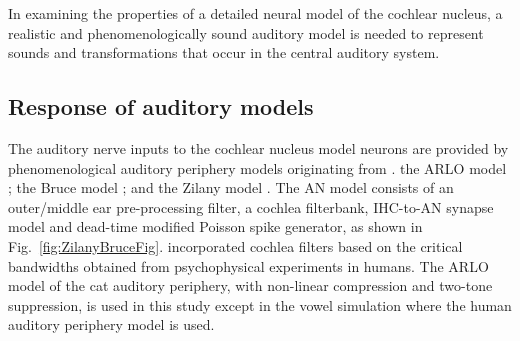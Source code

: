 \smallskip{}


\smallskip{}


%
\smallskip{}

In examining the properties of a detailed neural model of the cochlear nucleus,
a realistic and phenomenologically sound auditory model is needed to represent
sounds and transformations that occur in the central auditory system.

%
\smallskip{}
\subsection{Response of auditory models}\label{sec:CN:resp-audit-models}

The auditory nerve inputs to the cochlear nucleus model neurons are provided by
phenomenological auditory periphery models originating from
\citet{Carney:1993}. the ARLO model \citep{HeinzZhangEtAl:2001}; the Bruce model
\citep{BruceSachsEtAl:2003, ZilanyBruce:2006, ZilanyBruce:2007}; and the Zilany
model \citep{ZilanyBruceEtAl:2009}. The AN model consists of an outer/middle ear
pre-processing filter, a cochlea filterbank, IHC-to-AN synapse model and
dead-time modified Poisson spike generator, as shown in
Fig.~\ref{fig:ZilanyBruceFig}. \citep{HeinzZhangEtAl:2001} incorporated cochlea
filters based on the critical bandwidths obtained from psycho\-physical
experiments in humans. The ARLO model of the cat auditory periphery, with
non-linear compression and two-tone suppression, is used in this study except in
the vowel simulation where the human auditory periphery model is used.

\smallskip{}


